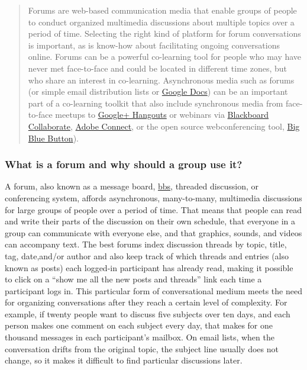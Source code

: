 
\begin{quote}
Forums are web-based communication media that enable groups of people to
conduct organized multimedia discussions about multiple topics over a
period of time. Selecting the right kind of platform for forum
conversations is important, as is know-how about facilitating ongoing
conversations online. Forums can be a powerful co-learning tool for
people who may have never met face-to-face and could be located in
different time zones, but who share an interest in co-learning.
Asynchronous media such as forums (or simple email distribution lists or
\href{http://www.youtube.com/watch?v=VVFbqHhkb-k}{Google Docs}) can be
an important part of a co-learning toolkit that also include synchronous
media from face-to-face meetups to
\href{http://www.google.com/+/learnmore/hangouts/}{Google+ Hangouts} or
webinars via
\href{http://www.blackboard.com/Platforms/Collaborate/Products/Blackboard-Collaborate.aspx}{Blackboard
Collaborate},
\href{http://www.adobe.com/products/adobeconnect.html}{Adobe Connect},
or the open source webconferencing tool,
\href{http://www.bigbluebutton.org/}{Big Blue Button}).
\end{quote}

\subsubsection{What is a forum and why should a group use it?}

A forum, also known as a message board,
\href{http://en.wikipedia.org/wiki/Bulletin_board_system}{bbs}, threaded
discussion, or conferencing system, affords asynchronous, many-to-many,
multimedia discussions for large groups of people over a period of time.
That means that people can read and write their parts of the discussion
on their own schedule, that everyone in a group can communicate with
everyone else, and that graphics, sounds, and videos can accompany text.
The best forums index discussion threads by topic, title, tag,
date,and/or author and also keep track of which threads and entries
(also known as posts) each logged-in participant has already read,
making it possible to click on a ``show me all the new posts and
threads'' link each time a participant logs in. This particular form of
conversational medium meets the need for organizing conversations after
they reach a certain level of complexity. For example, if twenty people
want to discuss five subjects over ten days, and each person makes one
comment on each subject every day, that makes for one thousand messages
in each participant's mailbox. On email lists, when the conversation
drifts from the original topic, the subject line usually does not
change, so it makes it difficult to find particular discussions later.

